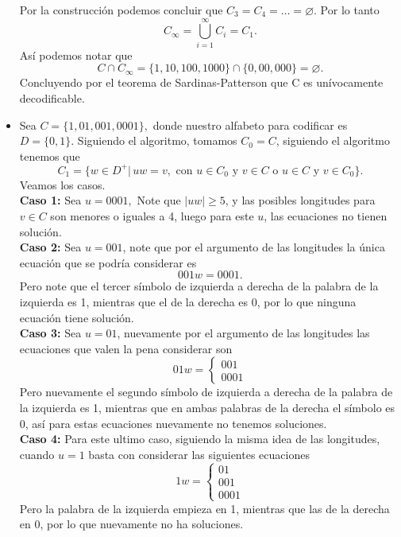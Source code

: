 \begin{sols}
\begin{itemize}
         Por la construcción podemos concluir que $C_3=C_4=\dots=\varnothing.$ Por lo tanto
         $$C_\infty=\bigcup_{i=1}^\infty C_i=C_1.$$
         Así podemos notar que
         $$C\cap C_\infty =\{1,10,100,1000\}\cap\{0,00,000\}=\varnothing.$$
         Concluyendo por el teorema de Sardinas-Patterson que C es unívocamente decodificable.

         \item Sea $C=\{1,01,001,0001\},$ donde nuestro alfabeto para codificar es $D=\{0,1\}.$ Siguiendo el algoritmo, tomamos $C_0=C$, siguiendo el algoritmo tenemos que
         $$C_1=\{w\in D^+|\,uw=v, \text{ con } u\in C_0 \text{ y } v\in C \text{ o } u\in C \text{ y } v\in C_0 \}.$$
         Veamos los casos.\\

         \textbf{Caso 1:} Sea $u=0001,$ Note que $|uw|\geq 5$, y las posibles longitudes para $v\in C$ son menores o iguales a 4, luego para este $u$, las ecuaciones no tienen solución.\\

         \textbf{Caso 2:} Sea $u=001$, note que por el argumento de las longitudes la única ecuación que se podría considerar es
         $$001w=0001.$$
         Pero note que el tercer símbolo de izquierda a derecha de la palabra de la izquierda es 1, mientras que el de la derecha es 0, por lo que ninguna ecuación tiene solución.\\

         \textbf{Caso 3:} Sea $u=01$, nuevamente por el argumento de las longitudes las ecuaciones que valen la pena considerar son
         $$01w=\begin{cases}
             001\\
         0001
         \end{cases}$$
         Pero nuevamente el segundo símbolo de izquierda a derecha de la palabra de la izquierda es 1, mientras que en ambas palabras de la derecha el símbolo es 0, así para estas ecuaciones nuevamente no tenemos soluciones.\\

         \textbf{Caso 4:} Para este ultimo caso, siguiendo la misma idea de las longitudes, cuando $u=1$ basta con considerar las siguientes ecuaciones
         $$1w=\begin{cases}
             01\\
             001\\
             0001
         \end{cases}$$
         Pero la palabra de la izquierda empieza en 1, mientras que las de la derecha en 0, por lo que nuevamente no ha soluciones.\\


\end{itemize}
\end{sols}
